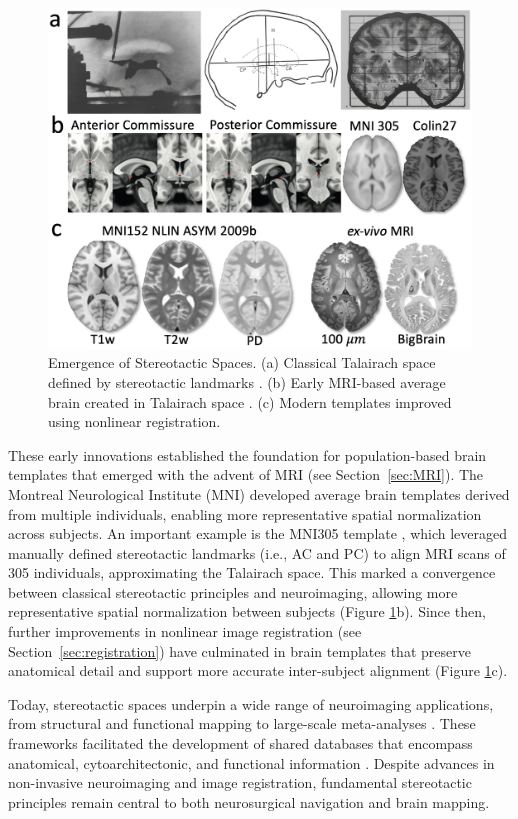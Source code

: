 \begin{figure}[hbt!]
    \centering
    \includegraphics[width=0.86\linewidth]{figs/ch1_Figure_templates2.png}
    \caption{Emergence of Stereotactic Spaces. (a) Classical Talairach space defined by stereotactic landmarks \cite{Talairach1957-eb}. (b) Early MRI-based average brain created in Talairach space \cite{Collins1994-dx}. (c) Modern templates \cite{Fonov2011-ck,Edlow2020-mo, Amunts2013-vu} improved using nonlinear registration.}
    \label{fig:ch1_Figure_templates}
\end{figure}

These early innovations established the foundation for population-based brain templates that emerged with the advent of MRI (see Section~\ref{sec:MRI}). The Montreal Neurological Institute (MNI) developed average brain templates derived from multiple individuals, enabling more representative spatial normalization across subjects. An important example is the MNI305 template \cite{Collins1994-ue}, which leveraged manually defined stereotactic landmarks (i.e., AC and PC) to align MRI scans of 305 individuals, approximating the Talairach space. This marked a convergence between classical stereotactic principles and neuroimaging, allowing more representative spatial normalization between subjects (Figure \ref{fig:ch1_Figure_templates}b). Since then, further improvements in nonlinear image registration (see Section~\ref{sec:registration}) have culminated in brain templates \cite{Fonov2009-oi} that preserve anatomical detail and support more accurate inter-subject alignment (Figure \ref{fig:ch1_Figure_templates}c).

Today, stereotactic spaces underpin a wide range of neuroimaging applications, from structural and functional mapping \cite{Evans2012-xp,Lau2022-nu} to large-scale meta-analyses \cite{Yarkoni2011-sr,Dockes2020-nw}. These frameworks facilitated the development of shared databases that encompass anatomical, cytoarchitectonic, and functional information \cite{Eickhoff2005-qb}. Despite advances in non-invasive neuroimaging and image registration, fundamental stereotactic principles remain central to both neurosurgical navigation and brain mapping.


